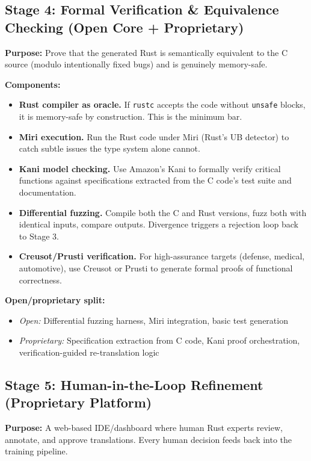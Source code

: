 \documentclass[11pt,a4paper]{article}
\theoremstyle{definition}
\theoremstyle{remark}
\begin{document}
\subsection{Stage 4: Formal Verification \& Equivalence Checking (Open Core + Proprietary)}

\textbf{Purpose:} Prove that the generated Rust is semantically equivalent to the C source (modulo intentionally fixed bugs) and is genuinely memory-safe.

\textbf{Components:}
\begin{itemize}[leftmargin=2em]
\item \textbf{Rust compiler as oracle.} If \texttt{rustc} accepts the code without \texttt{unsafe} blocks, it is memory-safe by construction. This is the minimum bar.
\item \textbf{Miri execution.} Run the Rust code under Miri (Rust's UB detector) to catch subtle issues the type system alone cannot.
\item \textbf{Kani model checking.} Use Amazon's Kani to formally verify critical functions against specifications extracted from the C code's test suite and documentation.
\item \textbf{Differential fuzzing.} Compile both the C and Rust versions, fuzz both with identical inputs, compare outputs. Divergence triggers a rejection loop back to Stage 3.
\item \textbf{Creusot/Prusti verification.} For high-assurance targets (defense, medical, automotive), use Creusot or Prusti to generate formal proofs of functional correctness.
\end{itemize}

\textbf{Open/proprietary split:}
\begin{itemize}[leftmargin=2em]
\item \textit{Open:} Differential fuzzing harness, Miri integration, basic test generation
\item \textit{Proprietary:} Specification extraction from C code, Kani proof orchestration, verification-guided re-translation logic
\end{itemize}

\subsection{Stage 5: Human-in-the-Loop Refinement (Proprietary Platform)}

\textbf{Purpose:} A web-based IDE/dashboard where human Rust experts review, annotate, and approve translations. Every human decision feeds back into the training pipeline.
\end{document}
